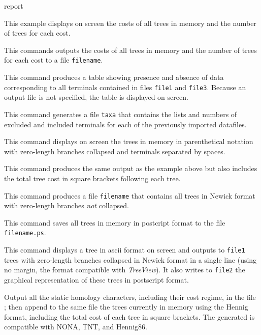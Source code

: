 \begin{command}{report}{}
\begin{poyexamples}
            {This example displays on screen the costs of all trees in memory and the
            number of trees for each cost.}

            {This commands outputs the costs of all trees in memory and the
            number of trees for each cost to a file \texttt{filename}.}

		{This command produces a table showing presence
		and absence of data corresponding to all terminals contained
		in files \texttt{file1} and \texttt{file3}. Because an output
		file is not specified, the table is displayed on screen.}
		
		{This command generates a file \texttt{taxa} that contains the
		lists and numbers of excluded and included terminals for each of the previously
		imported datafiles.}
		
            {This command displays on screen the trees in memory in parenthetical
            notation with zero-length branches collapsed and terminals
            separated by spaces.}

            {This command produces the same output as the example above
            but also includes the total tree cost in square brackets
            following each tree.}

            {This command produces a file \texttt{filename} that contains
            all trees in Newick format with zero-length branches \emph{not}
            collapsed.}
		
            {This command saves all trees in memory in
            postcript format to the file \texttt{filename.ps}.}

		{This command displays a tree in ascii format on screen and outputs
		to \texttt{file1} trees with zero-length branches collapsed in Newick format
		in a single line (using no margin, the format compatible with \emph{TreeView}). It
		also writes to \texttt{file2} the graphical representation of these trees in
		postscript format.}

            {Output all the static homology characters, including their cost
            regime, in the file ; then append to the same
            file the trees currently in memory using the Hennig format, 
            including the total cost of each tree in square brackets. The
            generated  is compatible with NONA, TNT, and
            Hennig86.
             }
            

\end{poyexamples}
\end{command}
